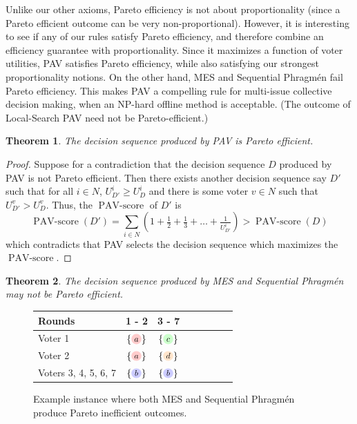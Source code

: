 \documentclass[10pt]{scrartcl}
\theoremstyle{plain}
\newtheorem{theorem}{Theorem}[section]
\theoremstyle{definition}
\renewcommand*{\ge}{\geqslant}
\newcommand{\alternativea}{\tikz[baseline=-3pt,transform shape,scale=0.85]{\node[text height=6pt,inner sep=1pt,fill=red!20,    circle,minimum width=12pt] (x) {$a$};}}
\newcommand{\alternativeb}{\tikz[baseline=-3pt,transform shape,scale=0.85]{\node[text height=6pt,inner sep=1pt,fill=blue!20,   circle,minimum width=12pt] (x) {$b$};}}
\newcommand{\alternativec}{\tikz[baseline=-3pt,transform shape,scale=0.85]{\node[text height=6pt,inner sep=1pt,fill=green!20,  circle,minimum width=12pt] (x) {$c$};}}
\newcommand{\alternatived}{\tikz[baseline=-3pt,transform shape,scale=0.85]{\node[text height=6pt,inner sep=1pt,fill=orange!20, circle,minimum width=12pt] (x) {$d$};}}
\begin{document}
Unlike our other axioms, Pareto efficiency is not about proportionality (since a Pareto efficient outcome can be very non-proportional). However, it is interesting to see if any of our rules satisfy Pareto efficiency, and therefore combine an efficiency guarantee with proportionality. Since it maximizes a function of voter utilities, PAV satisfies Pareto efficiency, while also satisfying our strongest proportionality notions. On the other hand, MES and Sequential Phragm\'en fail Pareto efficiency. This makes PAV a compelling rule for multi-issue collective decision making, when an NP-hard offline method is acceptable. (The outcome of Local-Search PAV need not be Pareto-efficient.)


\begin{theorem}
    \label{thm:PAV_satisfies_PE}
    The decision sequence produced by PAV is Pareto efficient. 
\end{theorem}

\begin{proof}
    Suppose for a contradiction that the decision sequence $D$ produced by PAV is not Pareto efficient. Then there exists another decision sequence say $D'$ such that for all $i \in N$, $U^i_{D'} \ge U^i_D$ and there is some voter $v \in N$ such that $U^v_{D'} > U^v_D$. Thus, the $\operatorname{PAV-score}$ of $D'$ is
    \[
    \operatorname{PAV-score}(D') = 
    \sum_{i\in N} \left ( 1 + \tfrac12 + \tfrac13 + \dots + \tfrac1{U^i_{D'}} \right ) > \operatorname{PAV-score}(D)
    \] 
    which contradicts that PAV selects the decision sequence which maximizes the $\operatorname{PAV-score}$.
\end{proof}





\begin{theorem}\label{thm:MES_Phragmen_pareto_inefficient}
    The decision sequence produced by MES and Sequential Phragm\'en may not be Pareto efficient. 
\end{theorem}


\begin{figure}
	\vspace{-12pt}	
	\centering
	 \scalebox{0.95}
    {\setlength{\tabcolsep}{4pt}
		\begin{tabular}{lccccccc}
			\toprule
			Rounds & 1 - 2 & 3 - 7 \\
			\midrule
			Voter 1 & $\{\alternativea\}$ &  $\{\alternativec\}$ \\
			Voter 2 & $\{\alternativea\}$ &  $\{\alternatived\}$ \\
			Voters 3, 4, 5, 6, 7 & $\{\alternativeb\}$ &  $\{\alternativeb\}$ \\
\bottomrule
	\end{tabular}}
	\caption{Example instance where both MES and Sequential Phragm\'en produce Pareto inefficient outcomes.}
    \label{fig:not_pareto_efficient}
\end{figure}
\end{document}
